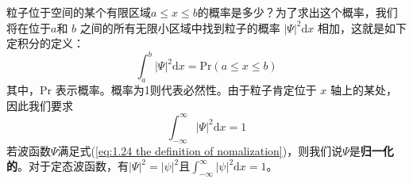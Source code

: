	\indent 粒子位于空间的某个有限区域$a \le x \le b$的概率是多少？为了求出这个概率，我们将在位于$a$和 $b$ 之间的所有无限小区域中找到粒子的概率 $\left|\Psi\right|^2\mathrm{d}x$ 相加，这就是如下定积分的定义：
	\begin{equation}
		\boxed{\int_{a}^{b}\left|\Psi\right|^2 \mathrm{d}x = \text{Pr}\left(a \le x \le b\right)}
		\label{eq:1.23 int of probability}
	\end{equation}
	其中，Pr 表示概率。概率为1则代表必然性。由于粒子肯定位于 $x$ 轴上的某处，因此我们要求
	\begin{equation}
		\boxed{\int_{-\infty}^{\infty} \left|\Psi\right|^2 \mathrm{d}x = 1}
		\label{eq:1.24 the definition of nomalization}
	\end{equation}
	若波函数$\Psi$满足式(\ref{eq:1.24 the definition of nomalization})，则我们说$\Psi$是\textbf{归一化的}。对于定态波函数，有$\left|\Psi\right|^2 = \left|\psi\right|^2$且$\int_{-\infty}^{\infty} \left|\psi\right|^2 \mathrm{d}x = 1$。
